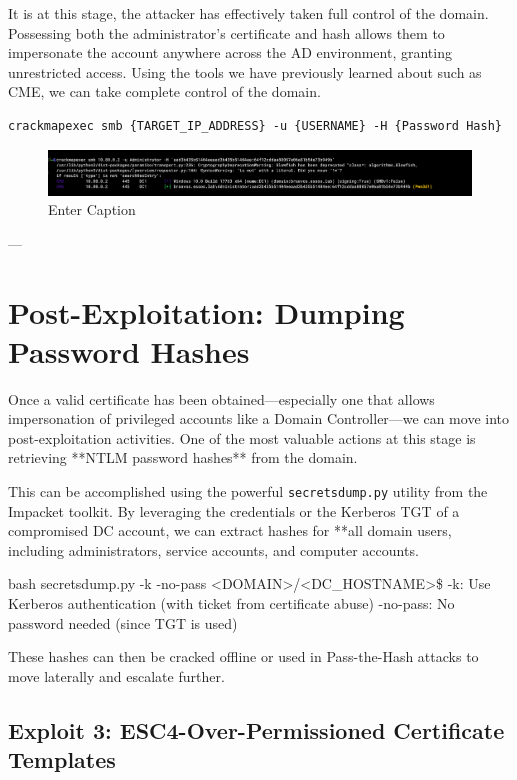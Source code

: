 It is at this stage, the attacker has effectively taken full control of the domain. Possessing both the administrator's certificate and hash allows them to impersonate the account anywhere across the AD environment, granting unrestricted access. Using the tools we have previously learned about such as CME, we can take complete control of the domain.
\begin{notebox}
\begin{verbatim}
crackmapexec smb {TARGET_IP_ADDRESS} -u {USERNAME} -H {Password Hash}
\end{verbatim}
\end{notebox}
\begin{figure}
    \centering
    \includegraphics[width=0.75\linewidth]{cme1.png}
    \caption{Enter Caption}
    \label{fig:placeholder}
\end{figure}

---

\section{Post-Exploitation: Dumping Password Hashes}

Once a valid certificate has been obtained—especially one that allows impersonation of privileged accounts like a Domain Controller—we can move into post-exploitation activities. One of the most valuable actions at this stage is retrieving **NTLM password hashes** from the domain.

This can be accomplished using the powerful \texttt{secretsdump.py} utility from the Impacket toolkit. By leveraging the credentials or the Kerberos TGT of a compromised DC account, we can extract hashes for **all domain users, including administrators, service accounts, and computer accounts.

bash
secretsdump.py -k -no-pass <DOMAIN>/<DC\_HOSTNAME>\$
-k: Use Kerberos authentication (with ticket from certificate abuse)
-no-pass: No password needed (since TGT is used)

These hashes can then be cracked offline or used in Pass-the-Hash attacks to move laterally and escalate further.



\subsection{Exploit 3: ESC4-Over-Permissioned Certificate Templates}

